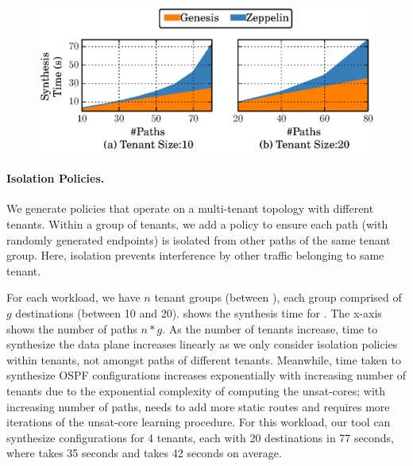 

\begin{figure}
	\includegraphics[width=0.58\columnwidth]{figures/ospfisolation.eps}
	\vspace{-8pt}
\end{figure}
\paragraph{Isolation Policies.}
We generate policies that operate 
on a multi-tenant topology with 
 different tenants.
Within a  group of tenants, we add a policy to ensure
each path  (with randomly generated endpoints)
is isolated from other paths of the same tenant group.
Here, isolation  prevents interference by other traffic belonging to
same tenant.  
 
For each 
workload, we have $n$ tenant groups (between ), 
each group comprised of $g$ destinations (between 10 and 20). 
shows the synthesis time 
for .
The x-axis shows the number of  paths $n * g$. 
 As the number of tenants increase, time to 
synthesize the data plane increases linearly as we only 
consider isolation policies within tenants, not amongst paths 
of different tenants. Meanwhile, time taken to synthesize 
OSPF configurations increases exponentially with increasing 
number of tenants due to the exponential complexity of computing 
the unsat-cores; with increasing number of 
paths,  needs to add more static routes  and requires more iterations of the unsat-core learning
procedure. 
For this workload, our tool can
synthesize configurations for 4 tenants, each with
20 destinations in 77 seconds, where \genesis takes 35 seconds and
\name takes 42 seconds on average. 


